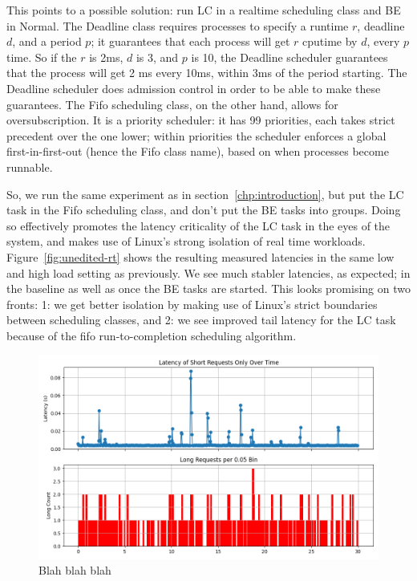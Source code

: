 This points to a possible solution: run LC in a realtime scheduling class and BE
in Normal. The Deadline class requires processes to specify a runtime $r$,
deadline $d$, and a period $p$; it guarantees that each process will get $r$
cputime by $d$, every $p$ time. So if the $r$ is 2ms, $d$ is 3, and $p$ is 10,
the Deadline scheduler guarantees that the process will get 2 ms every 10ms,
within 3ms of the period starting. The Deadline scheduler does admission control
in order to be able to make these guarantees. The Fifo scheduling class, on the
other hand, allows for oversubscription. It is a priority scheduler: it has 99
priorities, each takes strict precedent over the one lower; within priorities
the scheduler enforces a global first-in-first-out (hence the Fifo class name),
based on when processes become runnable.

So, we run the same experiment as in section~\ref{chp:introduction}, but put the
LC task in the Fifo scheduling class, and don't put the BE tasks into groups.
Doing so effectively promotes the latency criticality of the LC task in the eyes
of the system, and makes use of Linux's strong isolation of real time workloads.
Figure~\ref{fig:unedited-rt} shows the resulting measured latencies in the same
low and high load setting as previously. We see much stabler latencies, as
expected; in the baseline as well as once the BE tasks are started. This looks
promising on two fronts: 1: we get better isolation by making use of Linux's
strict boundaries between scheduling classes, and 2: we see improved tail
latency for the LC task because of the fifo run-to-completion scheduling
algorithm.

\begin{figure}[t]
    \centering
    \includegraphics[width=\columnwidth]{graphs/hol-blocking.png}
    \caption{Blah blah blah}\label{fig:hol-blocking}
\end{figure}


